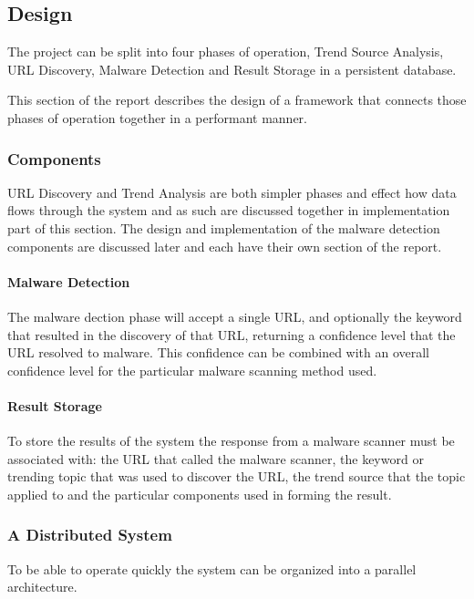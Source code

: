 \subsection{Design}
The project can be split into four phases of operation, Trend Source Analysis, URL Discovery, Malware Detection and Result Storage in a persistent database.

This section of the report describes the design of a framework that connects those phases of operation together in a performant manner.

\subsubsection{Components}
URL Discovery and Trend Analysis are both simpler phases and effect how data flows through the system and as such are discussed together in implementation part of this section. The design and implementation of the malware detection components are discussed later and each have their own section of the report.





\paragraph{Malware Detection}
The malware dection phase will accept a single URL, and optionally the keyword that resulted in the discovery of that URL, returning a confidence level that the URL resolved to malware.  This confidence can be combined with an overall confidence level for the particular malware scanning method used.

\paragraph{Result Storage}
To store the results of the system the response from a malware scanner must be associated with: the URL that called the malware scanner, the keyword or trending topic that was used to discover the URL, the trend source that the topic applied to and the particular components used in forming the result.

\subsubsection{A Distributed System}
To be able to operate quickly the system can be organized into a parallel architecture.

